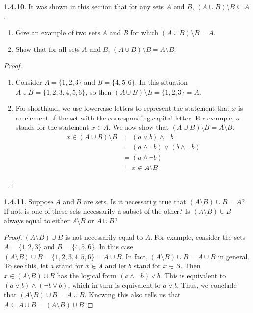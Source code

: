 \documentclass[12pt]{amsart}
\newenvironment{statement}[1]{\smallskip\noindent\color[rgb]{.6627, .3529, .6314} {\bf #1.}}{}
\theoremstyle{definition}
\theoremstyle{remark}
\begin{document}
\begin{statement}{1.4.10}
It was shown in this section that for any sets $A$ and $B$, $(A \cup B) \setminus B \subseteq A$.
\begin{enumerate}
	\item Give an example of two sets $A$ and $B$ for which $(A \cup B) \setminus B = A$.
	\item Show that for all sets $A$ and $B$, $(A \cup B) \setminus B = A \setminus B$.
\end{enumerate}
\end{statement}

\begin{proof}
\hfill
\begin{enumerate}
	\item Consider $A = \{ 1, 2, 3 \}$ and $B = \{ 4, 5, 6 \}$.
	In this situation $A \cup B = \{ 1, 2, 3, 4, 5, 6 \}$, so then $(A \cup B) \setminus B = \{ 1, 2, 3 \} = A$.
	\item For shorthand, we use lowercase letters to represent the statement that $x$ is an element of the set with the corresponding capital letter.
	For example, $a$ stands for the statement $x \in A$.
	We now show that $(A \cup B) \setminus B = A \setminus B$.
	\begin{align*}
		x \in (A \cup B) \setminus B
		&= (a \vee b) \wedge \neg b \\
		&= (a \wedge \neg b) \vee (b \wedge \neg b) \\
		&= (a \wedge \neg b) \\
		&= x \in A \setminus B
	\end{align*}
\end{enumerate}
\end{proof}


\begin{statement}{1.4.11}
Suppose $A$ and $B$ are sets.
Is it necessarily true that $(A \setminus B) \cup B = A$?
If not, is one of these sets necessarily a subset of the other?
Is $(A \setminus B) \cup B$ always equal to either $A \setminus B$ or $A \cup B$?
\end{statement}

\begin{proof}
$(A \setminus B) \cup B$ is not necessarily equal to $A$.
For example, consider the sets $A = \{ 1, 2, 3 \}$ and $B = \{ 4, 5, 6 \}$.
In this case $(A \setminus B) \cup B = \{ 1, 2, 3, 4, 5, 6 \} = A \cup B$.
In fact, $(A \setminus B) \cup B = A \cup B$ in general.
To see this, let $a$ stand for $x \in A$ and let $b$ stand for $x \in B$.
Then $x \in (A \setminus B) \cup B$ has the logical form $(a \wedge \neg b) \vee b$.
This is equivalent to $(a \vee b) \wedge (\neg b \vee b)$, which in turn is equivalent to $a \vee b$.
Thus, we conclude that $(A \setminus B) \cup B = A \cup B$.
Knowing this also tells us that $A \subseteq A \cup B = (A \setminus B) \cup B$
\end{proof}
\end{document}
